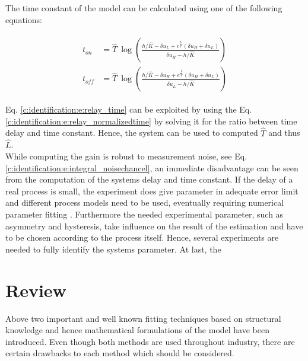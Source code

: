 The time constant of the model can be calculated using one of the following equations:

\begin{align}
\begin{split}
t_{on} &= \hat{T}~ \log\left( \frac{h/\hat{K}-\delta u_L + e^\frac{\hat{L}}{\hat{T}} \left(\delta u_H + \delta u_L \right) }{\delta u_H - h/\hat{K}}\right) \\
t_{off} &= \hat{T}~  \log\left( \frac{h/\hat{K}-\delta u_H + e^\frac{\hat{L}}{\hat{T}} \left(\delta u_H + \delta u_L \right) }{\delta u_L - h/\hat{K}}\right) 
\end{split}
\label{c:identification:e:relay_time}
\end{align}

Eq. \ref{c:identification:e:relay_time} can be exploited by using the Eq. \ref{c:identification:e:relay_normalizedtime} by solving it for the ratio between time delay and time constant. Hence, the system can be used to computed $\hat{T}$ and thus $\hat{L}$. \\

While computing the gain is robust to measurement noise, see Eq. \ref{c:identification:e:integral_noisechancel}, an immediate disadvantage can be seen from the computation of the systems delay and time constant. If the delay of a real process is small, the experiment does give parameter in adequate error limit \cite{Berner2016a} and different process models need to be used, eventually requiring numerical parameter fitting \cite[p. 31 ff.]{Berner2015}. Furthermore the needed experimental parameter, such as asymmetry and hysteresis, take influence on the result of the estimation \cite{Berner2016a} and have to be chosen according to the process itself. Hence, several experiments are needed to fully identify the systems parameter. At last, the 

\section{Review}
\label{c:identification:s:review}

Above two important and well known fitting techniques based on structural knowledge and hence mathematical formulations of the model have been introduced. Even though both methods are used throughout industry, there are certain drawbacks to each method which should be considered.\\

